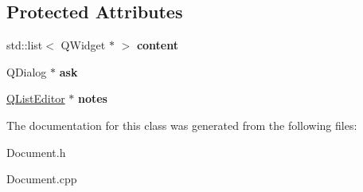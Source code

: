 \subsection*{\-Protected \-Attributes}
\begin{DoxyCompactItemize}
\item 
\hypertarget{classDocumentEditor_a2a21804611f483b627f3ed7cdaf3c793}{std\-::list$<$ \-Q\-Widget $\ast$ $>$ {\bfseries content}}\label{classDocumentEditor_a2a21804611f483b627f3ed7cdaf3c793}

\item 
\hypertarget{classDocumentEditor_ab27ebe3a03ae68be4dfdaf33bdfa04b8}{\-Q\-Dialog $\ast$ {\bfseries ask}}\label{classDocumentEditor_ab27ebe3a03ae68be4dfdaf33bdfa04b8}

\item 
\hypertarget{classDocumentEditor_aa8efcc8f9e9a9b1456042ce1ab3b1f4f}{\hyperlink{classQListEditor}{\-Q\-List\-Editor} $\ast$ {\bfseries notes}}\label{classDocumentEditor_aa8efcc8f9e9a9b1456042ce1ab3b1f4f}

\end{DoxyCompactItemize}


\-The documentation for this class was generated from the following files\-:\begin{DoxyCompactItemize}
\item 
\-Document.\-h\item 
\-Document.\-cpp\end{DoxyCompactItemize}
